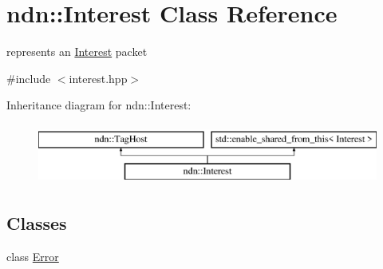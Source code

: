 \hypertarget{classndn_1_1Interest}{}\section{ndn\+:\+:Interest Class Reference}
\label{classndn_1_1Interest}


represents an \hyperlink{classndn_1_1Interest}{Interest} packet  




{\ttfamily \#include $<$interest.\+hpp$>$}

Inheritance diagram for ndn\+:\+:Interest\+:\begin{figure}[H]
\begin{center}
\leavevmode
\includegraphics[height=2.000000cm]{classndn_1_1Interest}
\end{center}
\end{figure}
\subsection*{Classes}
\begin{DoxyCompactItemize}
\item 
class \hyperlink{classndn_1_1Interest_1_1Error}{Error}
\end{DoxyCompactItemize}
